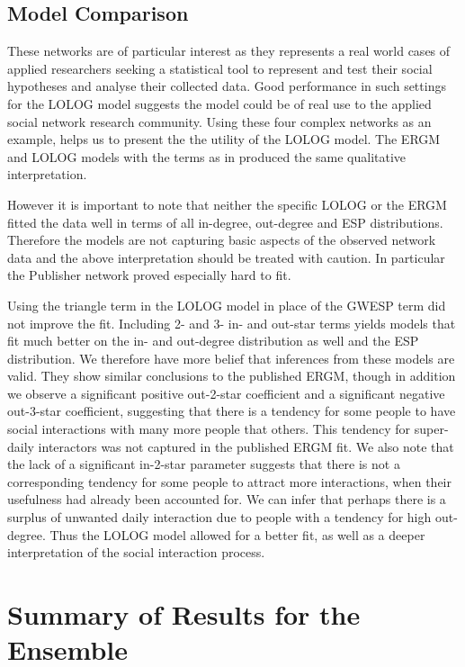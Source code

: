 \documentclass[
]{statsoc}
\begin{document}
\subsection{Model Comparison}

These networks are of particular interest as they represents a real
world cases of applied researchers seeking a statistical tool to
represent and test their social hypotheses and analyse their collected
data. Good performance in such settings for the LOLOG model suggests the
model could be of real use to the applied social network research
community. Using these four complex networks as an example, helps us to
present the the utility of the LOLOG model. The ERGM and LOLOG models
with the terms as in \cite{Sailer2012} produced the same qualitative
interpretation.

However it is important to note that neither the specific LOLOG or the
ERGM fitted the data well in terms of all in-degree, out-degree and ESP
distributions. Therefore the models are not capturing basic aspects of
the observed network data and the above interpretation should be treated
with caution. In particular the Publisher network proved especially hard
to fit.

Using the triangle term in the LOLOG model in place of the GWESP term
did not improve the fit. Including 2- and 3- in- and out-star terms
yields models that fit much better on the in- and out-degree
distribution as well and the ESP distribution. We therefore have more
belief that inferences from these models are valid. They show similar
conclusions to the published ERGM, though in addition we observe a
significant positive out-2-star coefficient and a significant negative
out-3-star coefficient, suggesting that there is a tendency for some
people to have social interactions with many more people that others.
This tendency for super-daily interactors was not captured in the
published ERGM fit. We also note that the lack of a significant
in-2-star parameter suggests that there is not a corresponding tendency
for some people to attract more interactions, when their usefulness had
already been accounted for. We can infer that perhaps there is a surplus
of unwanted daily interaction due to people with a tendency for high
out-degree. Thus the LOLOG model allowed for a better fit, as well as a
deeper interpretation of the social interaction process.

\section{Summary of Results for the Ensemble}\label{sec:results}
\end{document}
